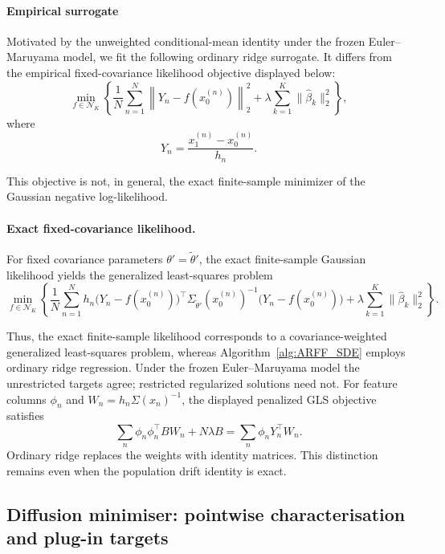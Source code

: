 \documentclass{article}
\begin{document}
{\color{black} \paragraph{Empirical surrogate}
Motivated by the unweighted conditional-mean identity under the frozen Euler--Maruyama model, we fit the following ordinary ridge surrogate. It differs from the empirical fixed-covariance likelihood objective displayed below:
\[
\min_{f\in\mathcal N_K}
\left\{
\frac{1}{N}
\sum_{n=1}^{N}
\left\|
Y_n-f(x_0^{(n)})
\right\|_2^2
+
\lambda
\sum_{k=1}^{K}
\|\hat{\beta}_k\|_2^2
\right\},
\]
where
\[
Y_n=\frac{x_1^{(n)}-x_0^{(n)}}{h_n}.
\]

This objective is not, in general, the exact finite-sample minimizer
of the Gaussian negative log-likelihood.

\paragraph{Exact fixed-covariance likelihood.}
For fixed covariance parameters $\theta'=\tilde\theta'$, the exact
finite-sample Gaussian likelihood yields the generalized least-squares
problem
\[
\min_{f\in\mathcal N_K}
\left\{
\frac1N
\sum_{n=1}^{N}
h_n
\bigl(
Y_n-f(x_0^{(n)})
\bigr)^\top
\Sigma_{\tilde\theta'}(x_0^{(n)})^{-1}
\bigl(
Y_n-f(x_0^{(n)})
\bigr)
+
\lambda
\sum_{k=1}^{K}
\|\hat\beta_k\|_2^2
\right\}.
\]

Thus, the exact finite-sample likelihood corresponds to a
covariance-weighted generalized least-squares problem, whereas
Algorithm~\ref{alg:ARFF_SDE} employs ordinary ridge regression.
Under the frozen Euler--Maruyama model the unrestricted targets agree; restricted regularized solutions need not. For feature columns $\phi_n$ and $W_n=h_n\Sigma(x_n)^{-1}$, the displayed penalized GLS objective satisfies
\[
\sum_n\phi_n\phi_n^\top B W_n+N\lambda B=\sum_n\phi_nY_n^\top W_n.
\]
Ordinary ridge replaces the weights with identity matrices. This distinction remains even when the population drift identity is exact.
}

\subsection{Diffusion minimiser: pointwise characterisation and plug-in targets}
\label{sec:diffusion_minimiser}
\end{document}
